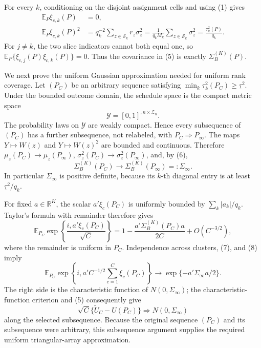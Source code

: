 For every \(k\), conditioning on the disjoint assignment cells and using (1) gives
\[
\begin{aligned}
\mathbb E_P\xi_{c,k}(P)&=0,\\
\mathbb E_P\xi_{c,k}(P)^2
&=q_k^{-2}\sum_{z\in\mathcal S_k}r_z\sigma_z^2
=\frac1{q_kM_k}\sum_{z\in\mathcal S_k}\sigma_z^2
=\frac{\tau_k^2(P)}{q_k}. 
\end{aligned} \tag{6}
\]
For \(j\ne k\), the two slice indicators cannot both equal one, so
\(\mathbb E_P\{\xi_{c,j}(P)\xi_{c,k}(P)\}=0\).  Thus the covariance in (5) is exactly \(\Sigma_B^{(K)}(P)\).

We next prove the uniform Gaussian approximation needed for uniform rank coverage.  Let \((P_C)\) be an arbitrary sequence satisfying
\(\min_k\tau_k^2(P_C)\geq\underline\tau^2\).  Under the bounded outcome domain, the schedule space is the compact metric space
\[
\mathcal Y=[0,1]^{,n\times\mathcal Z_n}.
\]
The probability laws on \(\mathcal Y\) are weakly compact.  Hence every subsequence of \((P_C)\) has a further subsequence, not relabeled, with \(P_C\Rightarrow P_\infty\).  The maps \(Y\mapsto W(z)\) and \(Y\mapsto W(z)^2\) are bounded and continuous.  Therefore \(\mu_z(P_C)\to\mu_z(P_\infty)\), \(\sigma_z^2(P_C)\to\sigma_z^2(P_\infty)\), and, by (6),
\[
\Sigma_B^{(K)}(P_C)\longrightarrow\Sigma_B^{(K)}(P_\infty)=:\Sigma_\infty. \tag{7}
\]
In particular \(\Sigma_\infty\) is positive definite, because its \(k\)-th diagonal entry is at least \(\underline\tau^2/q_k\).

For fixed \(a\in\mathbb R^K\), the scalar \(a'\xi_c(P_C)\) is uniformly bounded by
\(\sum_k|a_k|/q_k\).  Taylor's formula with remainder therefore gives
\[
\mathbb E_{P_C}\exp\!\left\{\frac{i,a'\xi_c(P_C)}{\sqrt C}\right\}
=1-\frac{a'\Sigma_B^{(K)}(P_C)a}{2C}+O(C^{-3/2}), \tag{8}
\]
where the remainder is uniform in \(P_C\).  Independence across clusters, (7), and (8) imply
\[
\mathbb E_{P_C}\exp\!\left\{i,a'C^{-1/2}\sum_{c=1}^C\xi_c(P_C)\right\}
\longrightarrow \exp\{-a'\Sigma_\infty a/2\}. \tag{9}
\]
The right side is the characteristic function of \(N(0,\Sigma_\infty)\); the characteristic-function criterion and (5) consequently give
\[
\sqrt C\{\widetilde U_C-U(P_C)\}\Rightarrow N(0,\Sigma_\infty) \tag{10}
\]
along the selected subsequence.  Because the original sequence \((P_C)\) and its subsequence were arbitrary, this subsequence argument supplies the required uniform triangular-array approximation.

